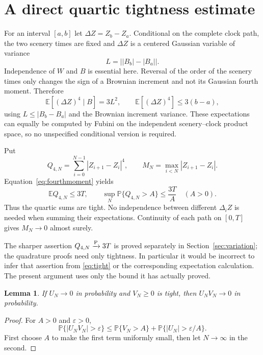 \documentclass[11pt]{article}
\newtheorem{lemma}[theorem]{Lemma}
\theoremstyle{remark}\newtheorem{remark}[theorem]{Remark}
\begin{document}
\section{A direct quartic tightness estimate}
For an interval $[a,b]$ let $\Delta Z=Z_b-Z_a$. Conditional on
the complete clock path, the two scenery times are fixed and
$\Delta Z$ is a centered Gaussian variable of variance
\[
 L=\big||B_b|-|B_a|\big|.
\]
Independence of $W$ and $B$ is essential here. Reversal of the
order of the scenery times only changes the sign of a Brownian
increment and not its Gaussian fourth moment. Therefore
\begin{equation}\label{eq:fourthmoment}
 \mathbb E[(\Delta Z)^4\mid B]=3L^2,
 \qquad\mathbb E[(\Delta Z)^4]\leq3(b-a),
\end{equation}
using $L\leq|B_b-B_a|$ and the Brownian increment variance.
These expectations can equally be computed by Fubini on the
independent scenery--clock product space, so no unspecified
conditional version is required.

Put
\[
 Q_{4,N}=\sum_{i=0}^{N-1}|Z_{i+1}-Z_i|^4,\qquad
 M_N=\max_{i<N}|Z_{i+1}-Z_i|.
\]
Equation~\eqref{eq:fourthmoment} yields
\begin{equation}\label{eq:tight}
 \mathbb E Q_{4,N}\leq3T,\qquad
 \sup_N\mathbb P\{Q_{4,N}>A\}\leq\frac{3T}{A}
 \quad(A>0).
\end{equation}
Thus the quartic sums are tight. No independence between different
$\Delta_iZ$ is needed when summing their expectations. Continuity
of each path on $[0,T]$ gives $M_N\to0$ almost surely.

The sharper assertion $Q_{4,N}\xrightarrow{\mathrm P}3T$ is proved separately in
Section~\ref{sec:variation}; the quadrature proofs need only tightness.
In particular it would be incorrect to infer that assertion from
\eqref{eq:tight} or the corresponding expectation calculation.
The present argument uses only the bound it has actually proved.

\begin{lemma}\label{lem:product}
If $U_N\to0$ in probability and $V_N\geq0$ is tight, then
$U_NV_N\to0$ in probability.
\end{lemma}
\begin{proof}
For $A>0$ and $\varepsilon>0$,
\[
 \mathbb P\{|U_NV_N|>\varepsilon\}
 \leq\mathbb P\{V_N>A\}
       +\mathbb P\{|U_N|>\varepsilon/A\}.
\]
First choose $A$ to make the first term uniformly small, then
let $N\to\infty$ in the second.
\end{proof}
\end{document}
